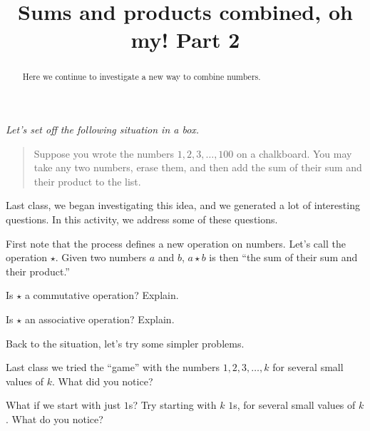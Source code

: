 \documentclass{ximera}
\title{Sums and products combined, oh my!  Part 2}
\begin{document}
\begin{abstract}
Here we continue to investigate a new way to combine numbers.
\end{abstract}
\maketitle

\emph{Let's set off the following situation in a box.} 
\begin{quote}
Suppose you wrote the numbers $1,2,3,\dots,100$ on a chalkboard. You
may take any two numbers, erase them, and then add the sum of their
sum and their product to the list.
\end{quote}
Last class, we began investigating this idea, and we generated a lot
of interesting questions.  In this activity, we address some of these
questions.

First note that the process defines a new operation on numbers.  Let's
call the operation $\star$.  Given two numbers $a$ and $b$, $a\star b$
is then ``the sum of their sum and their product.''

\begin{problem}
Is $\star$ a commutative operation?  Explain.  
\begin{freeResponse}
\end{freeResponse}
\end{problem}

\begin{problem}
Is $\star$ an associative operation?  Explain.  
\begin{freeResponse}
\end{freeResponse}
\end{problem}

Back to the situation, let's try some simpler problems.  

\begin{problem}
Last class we tried the ``game'' with the numbers $1,2,3,\dots, k$ for
several small values of $k$.  What did you notice?
\begin{freeResponse}
\end{freeResponse}
\end{problem}

\begin{problem}
What if we start with just $1$s?  Try starting with $k$ $1$s, for
several small values of $k$.  What do you notice?
\begin{freeResponse}
\end{freeResponse}
\end{problem}
\end{document}
